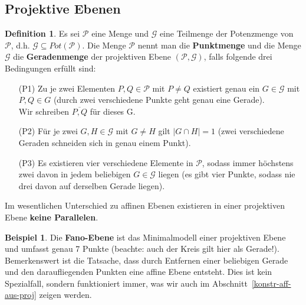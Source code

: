\documentclass[hidelinks]{article}
\theoremstyle{plain}
\theoremstyle{definition}
\newtheorem{defn}[thm]{Definition}
\newtheorem{bsp}[thm]{Beispiel}
\theoremstyle{rem}
\begin{document}
\begin{sloppypar}
\subsection{Projektive Ebenen}
\begin{defn} \label{projektive-ebene}
Es sei $\mathcal{P}$ eine Menge und $\mathcal{G}$ eine Teilmenge der Potenzmenge von $\mathcal{P}$, d.h. $\mathcal{G}\subseteq Pot(\mathcal{P})$.
Die Menge $\mathcal{P}$ nennt man die \textbf{Punktmenge} und die Menge $\mathcal{G}$ die \textbf{Geradenmenge} der projektiven Ebene $(\mathcal{P},\mathcal{G})$, falls folgende drei Bedingungen erfüllt sind:
	\begin{enumerate}
		\item[(P1)] Zu je zwei Elementen $P, Q\in \mathcal{P}$ mit $P\ne Q$ existiert genau ein $G\in\mathcal{G}$ mit $P, Q \in G$ (durch zwei verschiedene Punkte geht genau eine Gerade).\\
		Wir schreiben $\overline{P,Q}$ für dieses G.
		\item[(P2)] Für je zwei $G,H\in\mathcal{G}$ mit $G\ne H$ gilt $|G\cap H|=1$ (zwei verschiedene Geraden schneiden sich in genau einem Punkt).
		\item[(P3)] Es existieren vier verschiedene Elemente in $\mathcal{P}$, sodass immer höchstens zwei davon in jedem beliebigen $G\in\mathcal{G}$ liegen (es gibt vier Punkte, sodass nie drei davon auf derselben Gerade liegen).
	\end{enumerate}
\end{defn}
Im wesentlichen Unterschied zu affinen Ebenen existieren in einer projektiven Ebene \textbf{keine Parallelen}.

\begin{bsp}\label{fano}
Die \textbf{Fano-Ebene} ist das Minimalmodell einer projektiven Ebene und umfasst genau 7 Punkte (beachte: auch der Kreis gilt hier als Gerade!).\cite[Seite~9]{projmin}\\
Bemerkenswert ist die Tatsache, dass durch Entfernen einer beliebigen Gerade und den daraufliegenden Punkten eine affine Ebene entsteht. Dies ist kein Spezialfall, sondern funktioniert immer, was wir auch im Abschnitt~\ref{konstr-aff-aus-proj} zeigen werden.
\begin{figure}[H]
\centering
{}
\end{figure}
\end{bsp}
\end{sloppypar}
\end{document}
